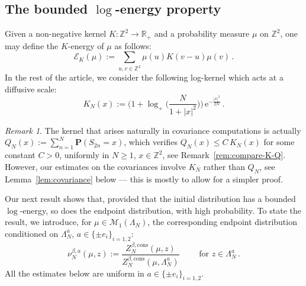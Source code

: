 \documentclass[11pt]{amsart}
\numberwithin{equation}{section}
\newcommand*{\bP}{\mathbf{P}}
\newcommand*{\numberset}{\mathbb}
\newcommand*{\Z}{\numberset{Z}}
\newcommand*{\R}{\numberset{R}}
\newcommand{\e}{\mathrm{e}}
\newcommand*{\cons}{\mathrm{cons}}
\theoremstyle{plain}
\theoremstyle{definition}
\theoremstyle{remark}
\newtheorem{remark}[theorem]{Remark}
\begin{document}
\subsection{The bounded \texorpdfstring{\(\log\)}{log}-energy property}
\label{sec:log-energy}

Given a non-negative kernel \(K:\Z^2 \to \R_+\) and a probability measure \(\mu\) on \(\Z^2\), one may define the \(K\)-energy of \(\mu\) as follows:
\begin{equation}
       \label{def:energy}
       \mathcal{E}_{K}(\mu) := \sum_{u,v \in \Z^2} \mu(u)K(v-u)\mu(v)\,.
\end{equation}
In the rest of the article, we consider the following log-kernel which acts at a diffusive scale:
\begin{equation}
       \label{def:K-N}
     {  K_N(x) := \Big(1+\log_+\Big(\frac{N}{1+|x|^2}\Big)\Big) \, \e^{ - \frac{|x|^2}{2N}} \,.}
\end{equation}

\begin{remark}
       The kernel that arises naturally in covariance computations is actually \(Q_N(x):= \sum_{n=1}^N \bP(S_{2n}=x)\), which verifies \(Q_N(x) \leq C\, K_N(x)\) for some constant \(C>0\), uniformly in \(N\geq 1\), \(x\in \Z^2\), see Remark~\ref{rem:compare-K-Q}.
       However, our estimates on the covariances involve \(K_N\) rather than \(Q_N\), see Lemma~\ref{lem:covariance} below --- this is mostly to allow for a simpler proof.
\end{remark}







Our next result shows that, provided that the initial distribution has a bounded \(\log\)-energy, so does the endpoint distribution, with high probability.
To state the result, we introduce, for \(\mu \in \mathcal{M}_1(\Lambda_N)\), the corresponding endpoint distribution conditioned on \(\Lambda_N^a\), \(a\in \{\pm e_i\}_{i=1,2}\): 
\begin{equation}
       \label{def:pol-measure}
       \nu_N^{\beta,a}(\mu,z) :=  \frac{Z_N^{\beta,\cons}(\mu,z)}{Z_N^{\beta,\cons}(\mu,\Lambda_N^a)} \qquad \text{ for } z\in \Lambda_N^a \,.
\end{equation}
All the estimates below are uniform in \(a\in \{\pm e_i\}_{i=1,2}\).
       
\end{document}
